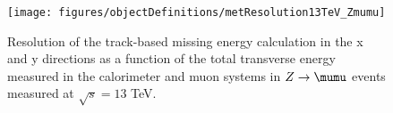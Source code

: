 \begin{figure}[h!]
\centering
\label{fig:metResolution_13TeV}
\texttt{[image: figures/objectDefinitions/metResolution13TeV\_Zmumu]}
\caption{Resolution of the track-based missing energy calculation in the x and y directions as a function of the total transverse energy measured in the calorimeter and muon systems in $Z\rightarrow\mumu$ events measured at $\sqrt{s}=13$ TeV.}
\end{figure}

